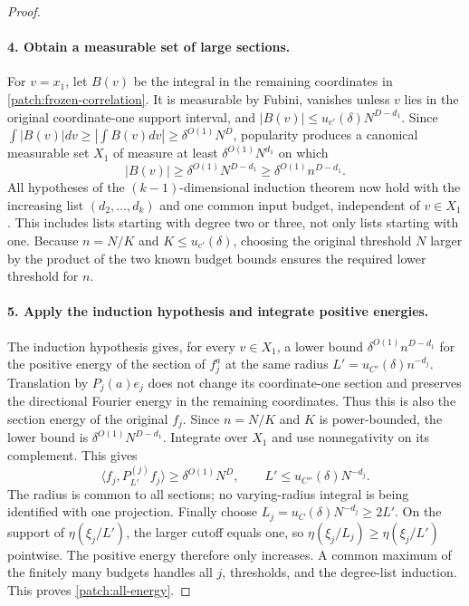 \documentclass[11pt]{article}
\theoremstyle{definition}
\begin{document}
\begin{proof}
\paragraph{4. Obtain a measurable set of large sections.}
For $v=x_1$, let $B(v)$ be the integral in the remaining coordinates in
\eqref{patch:frozen-correlation}.  It is measurable by Fubini, vanishes unless $v$ lies in
the original coordinate-one support interval, and
$|B(v)|\leq u_{c'}(\delta)N^{D-d_1}$.
Since $\int|B(v)|dv\geq|\int B(v)dv|\geq\delta^{O(1)}N^D$, popularity produces a
canonical measurable set $X_1$ of measure at least $\delta^{O(1)}N^{d_1}$ on which
\[
 |B(v)|\geq\delta^{O(1)}N^{D-d_1}\geq\delta^{O(1)}n^{D-d_1}.
\]
All hypotheses of the $(k-1)$-dimensional induction theorem now hold with the increasing
list $(d_2,\ldots,d_k)$ and one common input budget, independent of $v\in X_1$.
This includes lists starting with degree two or three, not only lists starting with one.
Because $n=N/K$ and $K\leq u_{c'}(\delta)$, choosing the original threshold $N$ larger
by the product of the two known budget bounds ensures the required lower threshold for $n$.

\paragraph{5. Apply the induction hypothesis and integrate positive energies.}
The induction hypothesis gives, for every $v\in X_1$, a lower bound
$\delta^{O(1)}n^{D-d_1}$ for the positive energy of the section of $f_j^a$ at the same
radius $L'=u_{C'}(\delta)n^{-d_j}$.  Translation by $P_j(a)e_j$ does not change its
coordinate-one section and preserves the directional Fourier energy in the remaining
coordinates.  Thus this is also the section energy of the original $f_j$.
Since $n=N/K$ and $K$ is power-bounded, the lower bound is
$\delta^{O(1)}N^{D-d_1}$.
Integrate over $X_1$ and use nonnegativity on its complement.  This gives
\[
 \langle f_j,P_{L'}^{(j)}f_j\rangle\geq\delta^{O(1)}N^D,
 \qquad L'\leq u_{C''}(\delta)N^{-d_j}.
\]
The radius is common to all sections; no varying-radius integral is being identified with
one projection.
Finally choose $L_j=u_C(\delta)N^{-d_j}\geq2L'$.  On the support of
$\eta(\xi_j/L')$, the larger cutoff equals one, so
$\eta(\xi_j/L_j)\geq\eta(\xi_j/L')$ pointwise.
The positive energy therefore only increases.  A common maximum of the finitely many
budgets handles all $j$, thresholds, and the degree-list induction.
This proves \eqref{patch:all-energy}.
\end{proof}
\end{document}
